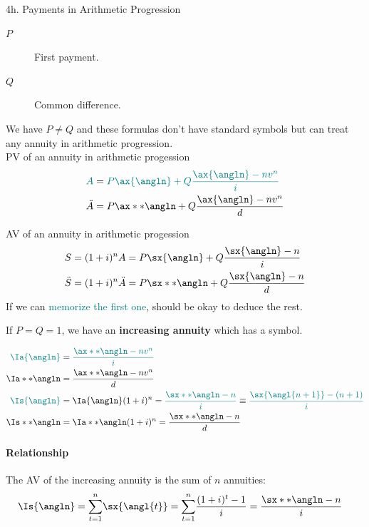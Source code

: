 \begin{CHPT_SUMM_AUTO}[label = {L.-4h}]{4h. Payments in Arithmetic Progression}
\begin{description}
	\item[$P$]	First payment.
	\item[$Q$]	Common difference.
\end{description}

We have $P \neq Q$ and these formulas don't have standard symbols but can treat any annuity in arithmetic progression.\\

PV of an annuity in arithmetic progession
\begin{align*}
	\textcolor{teal}{A}
	&=	\textcolor{teal}{P\ax{\angln} + Q \frac{\ax{\angln} - n v^{n}}{i}}	\\
	\ddot{A}	
	&=	P\ax**{\angln} + Q \frac{\ax{\angln} - n v^{n}}{d}
\end{align*}

AV of an annuity in arithmetic progession
\begin{align*}
	S	
	&=	(1 + i)^{n} A
	=	P\sx{\angln} + Q \frac{\sx{\angln} - n}{i}	\\
 	\ddot{S}	
	&=	(1 + i)^{n} \ddot{A}
 	=	P\sx**{\angln} + Q \frac{\sx{\angln} - n}{d}
\end{align*}
If we can \textcolor{teal}{memorize the first one}, should be okay to deduce the rest.

\tcbline

If $P = Q = 1$, we have an \textbf{increasing annuity} which has a symbol.

\begin{align*}
	\textcolor{teal}{\Ia{\angln}}
	&=	\textcolor{teal}{\frac{\ax**{\angln} - n v^{n}}{i}}	\\
	\Ia**{\angln}
	&=	\frac{\ax**{\angln} - n v^{n}}{d}	\\
	\textcolor{teal}{\Is{\angln}}
	&=	\Ia{\angln}(1 + i)^{n}
	=	\textcolor{teal}{\frac{\sx**{\angln} - n}{i}}
	\equiv	\textcolor{teal}{\frac{\sx{\angl{n + 1}} - (n + 1)}{i}}	\\
	\Is**{\angln}
	&=	\Ia**{\angln}(1 + i)^{n}
	=	\frac{\sx**{\angln} - n}{d}
\end{align*}

\paragraph*{Relationship}	The AV of the increasing annuity is the sum of $n$ annuities:
\begin{align*}
	\Is{\angln}
	&=	\underset{t = 1}{\overset{n}{\sum}} \sx{\angl{t}}	
	=	\underset{t = 1}{\overset{n}{\sum}}	\frac{(1 + i)^{t} - 1}{i}
	=	\frac{\sx**{\angln} - n}{i}
\end{align*}


\end{CHPT_SUMM_AUTO}
